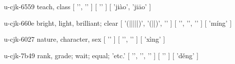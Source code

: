 \begin{multicols}{2}
\cjkgGlue{} u-cjk-6559  teach, class  [ '\cjkgGlue{}', '\cjkgGlue{}' ]  [ '\cjkgGlue{}' ]  [ 'jiào', 'ji{\mktsRsgFb{}ā}o' ] 

\cjkgGlue{} u-cjk-660e  bright, light, brilliant; clear  [ '\cjkgGlue{}(\cjkgGlue{}|\cjkgGlue{}|\cjkgGlue{}|\cjkgGlue{}|\cjkgGlue{}|\cjkgGlue{})', '\cjkgGlue{}(\cjkgGlue{}|\cjkgGlue{}|\cjkgGlue{})', '\cjkgGlue{}' ]  [ '\cjkgGlue{}', '\cjkgGlue{}', '\cjkgGlue{}' ]  [ 'míng' ] 

\cjkgGlue{} u-cjk-6027  nature, character, sex  [ '\cjkgGlue{}' ]  [ '\cjkgGlue{}', '\cjkgGlue{}' ]  [ 'xìng' ] 

\cjkgGlue{} u-cjk-7b49  rank, grade; wait; equal; 'etc.'  [ '\cjkgGlue{}', '\cjkgGlue{}', '\cjkgGlue{}' ]  [ '\cjkgGlue{}' ]  [ 'd{\mktsRsgFb{}ě}ng' ] 


\end{multicols}
